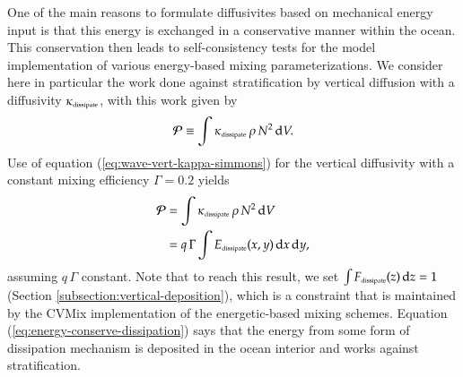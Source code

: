 One of the main reasons to formulate diffusivites based on mechanical
energy input is that this energy is exchanged in a conservative manner
within the ocean.  This conservation then leads to self-consistency
tests for the model implementation of various energy-based mixing
parameterizations.  We consider here in particular the work done
against stratification by vertical diffusion with a diffusivity
$\kappa_{\mbox{\tiny dissipate}}$, with this work given by
\begin{equation}
 {\cal P} \equiv  \int \kappa_{\mbox{\tiny dissipate}} \, \rho \, N^{2} \, \mathrm{d}V. 
\end{equation}
Use of equation (\ref{eq:wave-vert-kappa-simmons}) for the vertical
diffusivity with a constant mixing efficiency $\Gamma = 0.2$ yields
\begin{equation}
\begin{split}
 {\cal P} &=  \int \kappa_{\mbox{\tiny dissipate}} \, \rho \, N^{2} \, \mathrm{d}V
 \\
 &= q \, \Gamma  \int  E_{\mbox{\tiny dissipate}}(x,y) \, \mathrm{d}x \, \mathrm{d}y,
\end{split}
\label{eq:energy-conserve-dissipation}
\end{equation}
assuming $q \, \Gamma$ constant.  Note that to reach this result, we
set $\int F_{\mbox{\tiny dissipate}}(z) \, \mathrm{d}z = 1$ (Section
\ref{subsection:vertical-deposition}), which is a constraint that is
maintained by the CVMix implementation of the energetic-based mixing
schemes.  Equation (\ref{eq:energy-conserve-dissipation}) says that
the energy from some form of dissipation mechanism is deposited in the
ocean interior and works against stratification.

